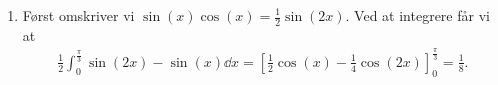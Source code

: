 \begin{enumerate}
			\item Først omskriver vi $\sin(x)\cos(x)=\frac{1}{2}\sin(2x)$. Ved at integrere får vi at
		\begin{align*}
		\frac{1}{2}\int_{0}^{\frac{\pi}{3}} \sin(2x)-\sin(x)\dd x= [\frac{1}{2}\cos(x)-\frac{1}{4}\cos(2x) ]_0^{\frac{\pi}{3}}=\frac{1}{8}. 
		\end{align*}
\end{enumerate}